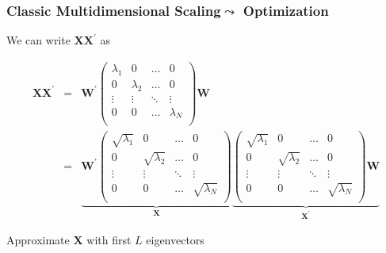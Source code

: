 \documentclass{beamer}
\numberwithin{equation}{section}
\begin{document}
\begin{frame}
\frametitle{Classic Multidimensional Scaling$\leadsto$ Optimization}

We can write $\boldsymbol{X}\boldsymbol{X}^{'}$ as

\begin{eqnarray}
\boldsymbol{X}\boldsymbol{X}^{'} & = & \boldsymbol{W}^{'}\begin{pmatrix}
\lambda_{1} & 0 & \hdots &  0 \\
0 & \lambda_{2} & \hdots & 0 \\
\vdots  & \vdots & \ddots & \vdots \\
0 & 0 & \hdots & \lambda_{N} \\
\end{pmatrix} \boldsymbol{W} \nonumber \\
& = & \underbrace{\boldsymbol{W}^{'} \begin{pmatrix}
\sqrt{\lambda_{1}} & 0 & \hdots &  0 \\
0 & \sqrt{\lambda_{2}} & \hdots & 0 \\
\vdots  & \vdots & \ddots & \vdots \\
0 & 0 & \hdots & \sqrt{\lambda_{N}} \\
\end{pmatrix}}_{\boldsymbol{X}} \underbrace{\begin{pmatrix}
\sqrt{\lambda_{1}} & 0 & \hdots &  0 \\
0 & \sqrt{\lambda_{2}} & \hdots & 0 \\
\vdots  & \vdots & \ddots & \vdots \\
0 & 0 & \hdots & \sqrt{\lambda_{N}} \\
\end{pmatrix} \boldsymbol{W}}_{\boldsymbol{X}^{'}} \nonumber 
\end{eqnarray}

Approximate $\boldsymbol{X}$ with first $L$ eigenvectors


\end{frame}
\end{document}
